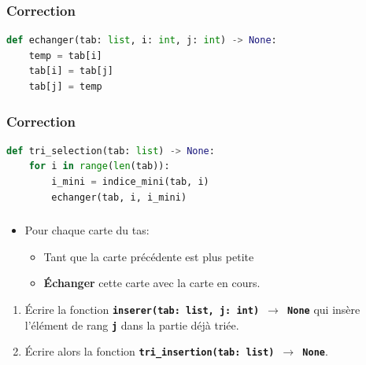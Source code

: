 \documentclass[svgnames,11pt]{beamer}
\begin{document}
\begin{frame}[fragile]
    \frametitle{Correction}

    \begin{center}
        \begin{lstlisting}[language=Python , basicstyle=\ttfamily\small, xleftmargin=2em, xrightmargin=0em]
def echanger(tab: list, i: int, j: int) -> None:
    temp = tab[i]
    tab[i] = tab[j]
    tab[j] = temp
\end{lstlisting}
    \end{center}

\end{frame}
\begin{frame}[fragile]
    \frametitle{Correction}

    \begin{center}
        \begin{lstlisting}[language=Python , basicstyle=\ttfamily\small, xleftmargin=2em, xrightmargin=0em]
def tri_selection(tab: list) -> None:
    for i in range(len(tab)):
        i_mini = indice_mini(tab, i)
        echanger(tab, i, i_mini)
\end{lstlisting}
    \end{center}

\end{frame}
\begin{frame}
    \frametitle{}
    \begin{itemize}
        \item Pour chaque carte du tas:
              \begin{itemize}
                  \item Tant que la carte précédente est plus petite
                  \item \textbf{Échanger} cette carte avec la carte en cours.
              \end{itemize}

    \end{itemize}
    \begin{activite}
        \begin{enumerate}
            \item Écrire la fonction \textbf{\texttt{inserer(tab: list, j: int) $\rightarrow$ None}} qui insère l'élément de rang \textbf{\texttt{j}} dans la partie déjà triée.
            \item Écrire alors la fonction \textbf{\texttt{tri\_insertion(tab: list) $\rightarrow$ None}}.
        \end{enumerate}
    \end{activite}

\end{frame}
\end{document}
